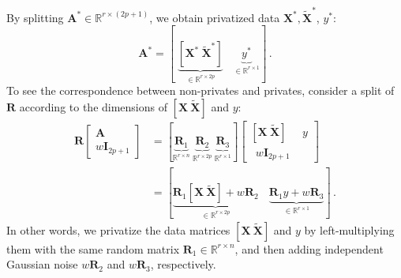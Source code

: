 \documentclass[11pt]{article}
\newcommand{\bX}{\boldsymbol{X}}
\newcommand{\bI}{\boldsymbol{I}}
\newcommand{\bXT}{\widetilde{\bX} }
\newcommand{\bA}{\boldsymbol{A}}
\newcommand{\bR}{\boldsymbol{R}}
\newcommand{\mbR}{\mathbb{R}}
\begin{document}
By splitting $\bA^*\in\mbR^{r\times(2p+1)}$, we obtain privatized data $\bX^*,\bXT^*$, $y^*$:
\[
\bA^* = [\phantom{.}\underbrace{[\bX^*\ \bXT^*]}_{\in\mbR^{r\times 2p}}\phantom{ss} \underbrace{y^*}_{\in\mbR^{r\times 1}}]\,.
\]
To see the correspondence between non-privates and privates, consider a split of $\bR$ according to the dimensions of $[\bX\ \bXT]$ and $y$:
\begin{align*}
    \bR\begin{bmatrix}
    \bA\\
    w\bI_{2p+1}
\end{bmatrix} 
&=[\underbrace{\bR_1}_{\mbR^{r\times n}}\ \underbrace{\bR_2}_{\mbR^{r\times 2p}}\ \underbrace{\bR_3}_{\mbR^{r\times 1}}]
\begin{bmatrix}
    [\bX\ \bXT]\phantom{sss}y\\
    \phantom{s}w\bI_{2p+1}
\end{bmatrix}\\
&=[\underbrace{\bR_1[\bX\ \bXT]+w\bR_2}_{\in\mbR^{r\times 2p}}\phantom{ss}
    \underbrace{\bR_1y+w\bR_3}_{\in\mbR^{r\times 1}}] \,.
\end{align*}
In other words, we privatize the data matrices $[\bX\ \bXT]$ and $y$ by left-multiplying them with the same random matrix $\bR_1\in\mbR^{r\times n}$, and then adding independent Gaussian noise $w\bR_2$ and $w\bR_3$, respectively.
\end{document}
